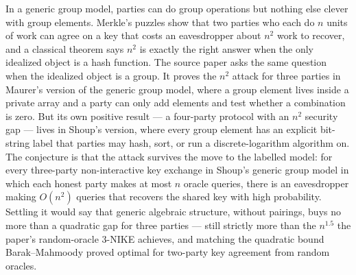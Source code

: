 \documentclass{conjura-conjecture}
\begin{document}

\vspace{0.4em}

\begin{informalconjecture}
In a generic group model, parties can do group operations but nothing
else clever with group elements. Merkle's puzzles show that two parties
who each do $n$ units of work can agree on a key that costs an
eavesdropper about $n^{2}$ work to recover, and a classical theorem says
$n^{2}$ is exactly the right answer when the only idealized object is a
hash function. The source paper asks the same question when the
idealized object is a group. It proves the $n^{2}$ attack for three
parties in Maurer's version of the generic group model, where a group
element lives inside a private array and a party can only add elements
and test whether a combination is zero. But its own positive result ---
a four-party protocol with an $n^{2}$ security gap --- lives in Shoup's
version, where every group element has an explicit bit-string label that
parties may hash, sort, or run a discrete-logarithm algorithm on. The
conjecture is that the attack survives the move to the labelled model:
for every three-party non-interactive key exchange in Shoup's generic
group model in which each honest party makes at most $n$ oracle queries,
there is an eavesdropper making $O(n^{2})$ queries that recovers the
shared key with high probability. Settling it would say that generic
algebraic structure, without pairings, buys no more than a quadratic gap
for three parties --- still strictly more than the $n^{1.5}$ the paper's
random-oracle 3-NIKE achieves, and matching the quadratic bound
Barak--Mahmoody proved optimal for two-party key agreement from random
oracles.
\end{informalconjecture}
\end{document}
